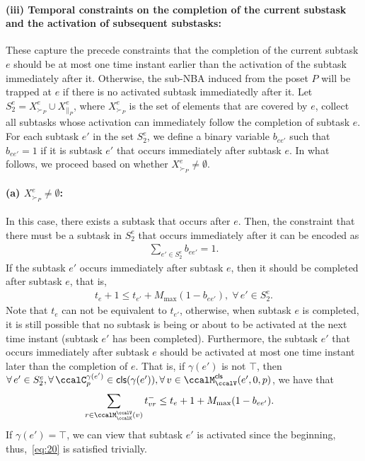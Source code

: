 \documentclass[Afour,sageh,times]{sagej}
\newcommand{\clause}[1]{\mathsf{cls}(#1)}
\begin{document}
{{{\paragraph{(iii)  Temporal constraints on  the  completion of the current substask and the activation  of subsequent substasks:}
These capture the precede constraints that the completion of the current subtask $e$ should be at most one time instant earlier than the activation of the subtask immediately after it. Otherwise, the sub-NBA induced from the poset $P$ will be trapped at $e$ if there is no activated subtask immediatedly after it. Let $S_2^e = X^e_{\succ_{P}} \cup X^e_{\|_{P}}$, where $X^e_{\succ_{P}}$ is the set of elements that are covered by $e$, collect all subtasks whose activation can immediately follow the completion of subtask $e$. For each subtask $e'$ in the set $S_2^e$, we define a binary variable $b_{ee'}$ such that  $b_{ee'}=1$ if it is subtask $e'$ that occurs immediately after subtask $e$. In what follows, we proceed based on whether $ X^e_{\succ_{P}} \neq \emptyset$.

\paragraph{(a) $ X^e_{\succ_{P}} \neq \emptyset$:}\label{activation:a} In this case, there exists a subtask that occurs after $e$. Then, the  constraint that there must be a subtask in $S_2^e$ that occurs immediately after it can be encoded as
\begingroup\makeatletter\def\f@size{10}\check@mathfonts
\def\maketag@@@#1{\hbox{\m@th\normalsize\normalfont#1}}%
\begin{align}\label{eq:bafter}
 \sum_{e'\in  S_2^e} b_{ee'} = 1.
\end{align}
\endgroup
If the subtask $e'$ occurs immediately  after subtask $e$, then it should be completed after subtask $e$, that is,
\begingroup\makeatletter\def\f@size{10}\check@mathfonts
\def\maketag@@@#1{\hbox{\m@th\normalsize\normalfont#1}}%
\begin{align}\label{eq:after}
  t_e + 1 \leq  t_{e'} + M_{\text{max}} (1 - b_{ee'}),\; \forall\, e' \in S_2^e.
\end{align}
\endgroup
Note that $t_e$ can not be equivalent to $t_{e'}$, otherwise, when subtask $e$ is completed, it is still possible that no subtask is being or about to be activated  at the next time instant (subtask $e'$ has been completed). Furthermore, the subtask $e'$ that occurs immediately  after subtask $e$ should be activated at most one time instant later than the completion of $e$. That is,  if $\gamma(e')$ is not $\top$, then $\forall\, e' \in S_2^e, \forall \, \ccalC_p^{\gamma(e')} \in \clause{\gamma(e')} , \forall \,v \in \ccalM^\mathsf{cls}_\ccalV(e',0,p)$, we have that
\begingroup\makeatletter\def\f@size{10}\check@mathfonts
\def\maketag@@@#1{\hbox{\m@th\normalsize\normalfont#1}}%
\begin{align}\label{eq:20}
  & \sum_{r\in \ccalM^\ccalV_{\ccalK}(v)} t_{vr}^-   \leq t_{e}  + 1 + M_{\text{max}} (1 - b_{ee'}).
\end{align}
\endgroup
If $\gamma(e')=\top$, we can view that subtask $e'$ is activated since the beginning, thus,~\eqref{eq:20} is satisfied trivially.

}}}
\end{document}
